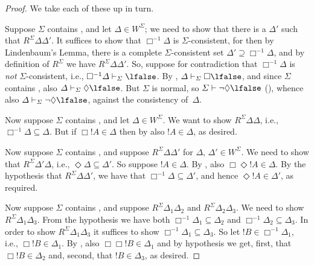\documentclass[../../../include/open-logic-section]{subfiles}
\begin{document}
\begin{proof}
  We take each of these up in turn.

  Suppose $\Sigma$ contains , and let $\Delta \in W^\Sigma$; we
  need to show that there is a $\Delta'$ such that $R^\Sigma
  \Delta\Delta'$. It suffices to show that $\Box^{-1}\Delta$ is
  $\Sigma$-consistent, for then by Lindenbaum's Lemma, there is a
  complete $\Sigma$-consistent set $\Delta' \supseteq
  \Box^{-1}\Delta$, and by definition of $R^\Sigma$
  we have
  $R^\Sigma \Delta\Delta'$. So, suppose for contradiction that
  $\Box^{-1}\Delta$ is \emph{not} $\Sigma$-consistent, i.e.,
  $\Box^{-1}\Delta \Proves[\Sigma] \lfalse$. By ,
  $\Delta \Proves[\Sigma] \Box\lfalse$, and since $\Sigma$ contains
  , also $\Delta \Proves[\Sigma] \Diamond\lfalse$. But $\Sigma$
  is normal, so $\Sigma \Proves \lnot\Diamond \lfalse$
  (), whence also $\Delta
  \Proves[\Sigma] \lnot\Diamond \lfalse$, against the consistency
  of~$\Delta$.

  Now suppose $\Sigma$ contains , and let $\Delta \in
  W^\Sigma$. We want to show $R^\Sigma \Delta\Delta$,
  i.e.,
  $\Box^{-1}\Delta \subseteq \Delta$. But if $\Box!A \in \Delta$ then
  by  also $!A \in \Delta$, as desired.

  Now suppose $\Sigma$ contains , and suppose $R^\Sigma
  \Delta\Delta'$ for $\Delta$, $\Delta' \in W^\Sigma$. We need to show
  that $R^\Sigma \Delta'\Delta$, i.e.,
  $\Diamond\Delta \subseteq \Delta'$. So suppose $!A \in \Delta$. By
  , also $\Box\Diamond!A \in \Delta$. By the hypothesis that
  $R^\Sigma \Delta\Delta'$, we have that $\Box^{-1}\Delta
  \subseteq \Delta'$, and hence $\Diamond!A \in \Delta'$, as required.

  Now suppose $\Sigma$ contains , and suppose $R^\Sigma
  \Delta_1\Delta_2$ and $R^\Sigma \Delta_2\Delta_3$. We need to show
  $R^\Sigma \Delta_1\Delta_3$. From the hypothesis we have both $\Box^{-1}\Delta_1
  \subseteq \Delta_2$ and $\Box^{-1}\Delta_2 \subseteq \Delta_3$. In
  order to show $R^\Sigma \Delta_1\Delta_3$ it suffices to show
  $\Box^{-1}\Delta_1 \subseteq \Delta_3$. So let $!B \in
  \Box^{-1}\Delta_1$, i.e., $\Box!B \in \Delta_1$. By , also
  $\Box\Box!B \in \Delta_1$ and by hypothesis we get, first, that
  $\Box!B \in \Delta_2$ and, second, that $!B \in \Delta_3$, as
  desired.


\end{proof}
\end{document}
